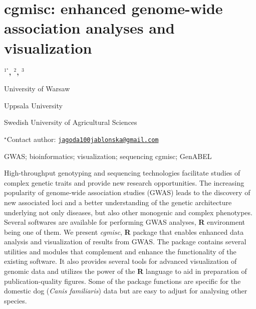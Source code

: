 \documentclass[\main/boa.tex]{subfiles}
\begin{document}
\section{cgmisc: enhanced genome-wide association analyses and visualization}

\begin{center}
  {\bf {}$^{1^\star}$, $^{2}$, $^{3}$}
\end{center}

\vskip 0.3cm

\begin{affiliations}
\begin{enumerate}
\begin{minipage}{0.915\textwidth}
\centering
\item University of Warsaw \\[-2pt]
\item Uppsala University \\[-2pt]
\item Swedish University of Agricultural Sciences \\[-2pt]
\end{minipage}
\end{enumerate}
$^\star$Contact author: \href{mailto:jagoda100jablonska@gmail.com}{\nolinkurl{jagoda100jablonska@gmail.com}}\\
\end{affiliations}

\vskip 0.5cm

\begin{minipage}{0.915\textwidth}
\keywords GWAS; bioinformatics; visualization; sequencing
\packages cgmisc; GenABEL
\end{minipage}

\vskip 0.8cm

High-throughput genotyping and sequencing technologies facilitate
studies of complex genetic traits and provide new research
opportunities. The increasing popularity of genome-wide association
studies (GWAS) leads to the discovery of new associated loci and a
better understanding of the genetic architecture underlying not only
diseases, but also other monogenic and complex phenotypes. Several
softwares are available for performing GWAS analyses, \textbf{R}
environment being one of them. We present \emph{cgmisc}, \textbf{R}
package that enables enhanced data analysis and visualization of results
from GWAS. The package contains several utilities and modules that
complement and enhance the functionality of the existing software. It
also provides several tools for advanced visualization of genomic data
and utilizes the power of the \textbf{R} language to aid in preparation
of publication-quality figures. Some of the package functions are
specific for the domestic dog (\emph{Canis familiaris}) data but are
easy to adjust for analysing other species.
\end{document}

